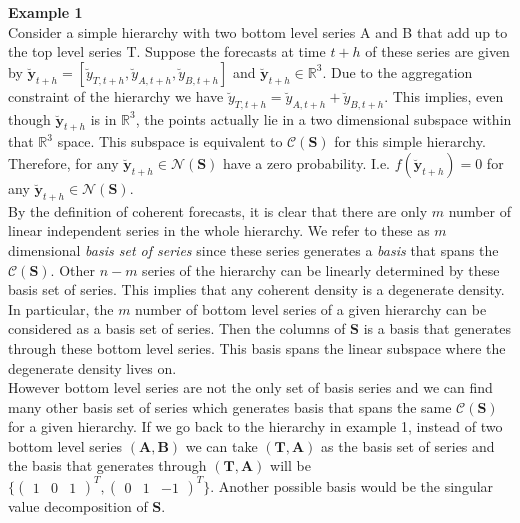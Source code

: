 \documentclass[a4paper, 11pt]{article}
\begin{document}
\noindent
\textbf{Example 1}\\
\noindent
Consider a simple hierarchy with two bottom level series A and B that add up to the top level series T. Suppose the forecasts at time $t+h$ of these series are given by $\mathbold{\breve{y}}_{t+h} = [\breve{y}_{T,t+h},\breve{y}_{A,t+h}, \breve{y}_{B,t+h}]$ and $\mathbold{\breve{y}}_{t+h} \in \bm{\mathbb{R}}^3$. Due to the aggregation constraint of the hierarchy we have $\breve{y}_{T,t+h}=\breve{y}_{A,t+h}+\breve{y}_{B,t+h}$. This implies, even though  $\mathbold{\breve{y}}_{t+h}$ is in $\bm{\mathbb{R}}^3$, the points actually lie in a two dimensional subspace within that $\bm{\mathbb{R}}^3$ space. This subspace is equivalent to $\mathscr{C}(\bm{S})$ for this simple hierarchy. Therefore, for any $\mathbold{\breve{y}}_{t+h} \in \mathscr{N}(\bm{S})$ have a zero probability. I.e. $f(\mathbold{\breve{y}}_{t+h})=0$ for any $\mathbold{\breve{y}}_{t+h} \in \mathscr{N}(\bm{S})$.\\

\noindent
By the definition of coherent forecasts, it is clear that there are only $m$ number of linear independent series in the whole hierarchy. We refer to these as $m$ dimensional \textit{basis set of series} since these series generates a \textit{basis} that spans the $\mathscr{C}(\bm{S})$. Other $n-m$ series of the hierarchy can be linearly determined by these basis set of series. This implies that any coherent density is a degenerate density. In particular, the $m$ number of bottom level series of a given hierarchy can be considered as a basis set of series. Then the columns of $\bm{S}$ is a basis that generates through these bottom level series. This basis spans the linear subspace where the degenerate density lives on.\\

\noindent
However bottom level series are not the only set of basis series and we can find many other basis set of series which generates basis that spans the same $\mathscr{C}(\bm{S})$ for a given hierarchy. If we go back to the hierarchy in example 1, instead of two bottom level series $(\bm{A,B})$ we can take $(\bm{T,A})$ as the basis set of series and the basis that generates through $(\bm{T,A})$ will be $\{\begin{pmatrix}
1&0&1 \end{pmatrix}^T, \begin{pmatrix}
0&1&-1 \end{pmatrix}^T\}$. Another possible basis would be the singular value decomposition of $\bm{S}$.\\
\end{document}
